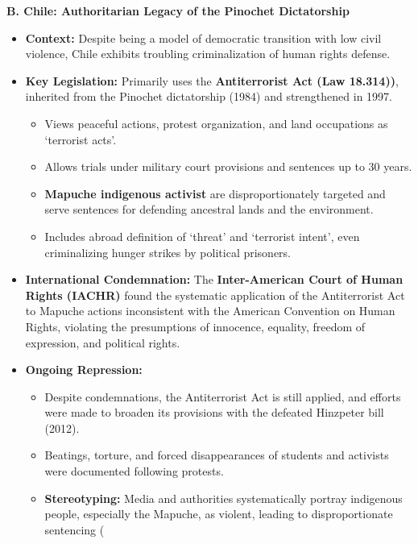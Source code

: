 \documentclass{article}
\begin{document}
    \noindent
\textbf{B. Chile: Authoritarian Legacy of the Pinochet Dictatorship}
    \begin{itemize}
        \item \textbf{Context:} Despite being a model of democratic
        transition with low civil violence, Chile exhibits troubling
        criminalization of human rights defense.
        \item \textbf{Key Legislation:} Primarily uses the
        \textbf{Antiterrorist Act (Law 18.314))}, inherited from the
        Pinochet dictatorship (1984) and strengthened in 1997.
        \begin{itemize}
            \item Views peaceful actions, protest organization, and land
            occupations as `terrorist acts'.
            \item Allows trials under military court provisions and
            sentences up to 30 years.
            \item \textbf{Mapuche indigenous activist} are
            disproportionately targeted and serve sentences for defending
            ancestral lands and the environment.
            \item Includes abroad definition of `threat' and `terrorist
            intent', even criminalizing hunger strikes by political prisoners.
        \end{itemize}
        \item \textbf{International Condemnation:} The
        \textbf{Inter-American Court of Human Rights (IACHR)} found the
        systematic application of the Antiterrorist Act to Mapuche actions
        inconsistent with the American Convention on Human Rights, violating
        the presumptions of innocence, equality, freedom of expression, and
        political rights.
        \item \textbf{Ongoing Repression:}
        \begin{itemize}
            \item Despite condemnations, the Antiterrorist Act is still
            applied, and efforts were made to broaden its provisions with
            the defeated Hinzpeter bill (2012).
            \item Beatings, torture, and forced disappearances of students
            and activists were documented following protests.
            \item \textbf{Stereotyping:} Media and authorities
            systematically portray indigenous people, especially the
            Mapuche, as violent, leading to disproportionate sentencing (

\end{itemize}
\end{itemize}
\end{document}
